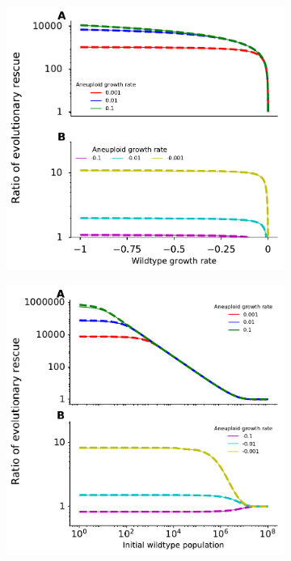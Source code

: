 \documentclass[12pt]{extarticle}
\begin{document}
\begin{figure}[p]
\begin{subfigure}{0.5\textwidth}
\includegraphics[width=1\textwidth]{Figures/RatioEvolRescue.pdf}
\end{subfigure}
\begin{subfigure}{0.5\textwidth}
\includegraphics[width=1\textwidth]{Figures/RatioEvolRescuePopulationSize.pdf}

\end{subfigure}
\end{figure}
\end{document}
